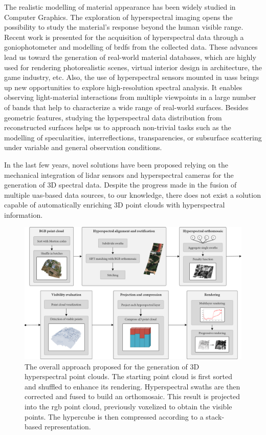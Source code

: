 The realistic modelling of material appearance has been widely studied in Computer Graphics. The exploration of hyperspectral imaging opens the possibility to study the material's response beyond the human visible range. Recent work is presented for the acquisition of hyperspectral data through a goniophotometer and modelling of \acrshort{brdf}s from the collected data. These advances lead us toward the generation of real-world material databases, which are highly used for rendering photorealistic scenes, virtual interior design in architecture, the game industry, etc. Also, the use of hyperspectral sensors mounted in \acrshort{uas}s brings up new opportunities to explore high-resolution spectral analysis. It enables observing light-material interactions from multiple viewpoints in a large number of bands that help to characterize a wide range of real-world surfaces. Besides geometric features, studying the hyperspectral data distribution from reconstructed surfaces helps us to approach non-trivial tasks such as the modelling of specularities, interreflections, transparencies, or subsurface scattering under variable and general observation conditions. 

In the last few years, novel solutions have been proposed relying on the mechanical integration of \acrshort{lidar} sensors and hyperspectral cameras for the generation of 3D spectral data. Despite the progress made in the fusion of multiple \acrshort{uas}-based data sources, to our knowledge, there does not exist a solution capable of automatically enriching 3D point clouds with hyperspectral information. 

\begin{figure}[bt]
    \centering
    \includegraphics[width=\linewidth]{figs/hyper_point_cloud/overview.png}
	\caption{The overall approach proposed for the generation of 3D hyperspectral point clouds. The starting point cloud is first sorted and shuffled to enhance its rendering. Hyperspectral swaths are then corrected and fused to build an orthomosaic. This result is projected into the \acrshort{rgb} point cloud, previously voxelized to obtain the visible points. The hypercube is then compressed according to a stack-based representation. }
	\label{fig:hyper_summary}
\end{figure}


